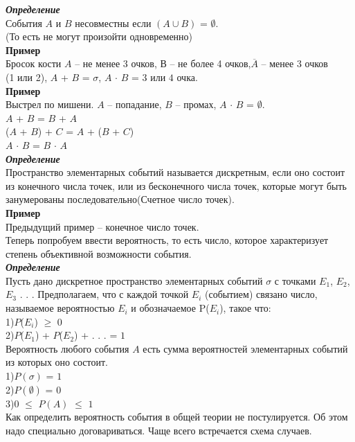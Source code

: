 \documentclass[russian, 12pt, fleqn,x11names]{article}
\begin{document}
\noindent
\textit{\textbf{Определение}} \\События $A$ и $B$ несовместны если $(A \cup B)$ =  $\emptyset$.\\
(То есть не могут произойти одновременно)\\
\textbf{Пример\\}Бросок кости $A$ -- не менее 3 очков, $В$ -- не более 4 очков,$\overline{A}$ -- менее 3 очков\\(1 или 2), $A$ + $B$ = {$\sigma$}, $A$ $\cdot$ $B$ = $3$ или $4$ очка.\\
\textbf{Пример}\\Выстрел по мишени. $A$ -- попадание, $B$ -- промах,  $A$ $\cdot$ $B$ = $\emptyset$.\\
$A$ + $B$ = $B$ + $A$\\
($A$ + $B$) + $C$ = $A$ + ($B$ + $C$)\\
$A$ $\cdot$ $B$ = $B$  $\cdot$ $A$\\
\textit{\textbf{Определение}}\\Пространство элементарных событий называется дискретным, если оно состоит из конечного числа точек, или из бесконечного числа точек, которые могут быть занумерованы последовательно(Счетное число точек).\\
\textbf{Пример}\\Предыдущий пример -- конечное число точек.\\
Теперь попробуем ввести вероятность, то есть число, которое характеризует степень объективной возможности события.\\
\textit{\textbf{Определение}}\\Пусть дано дискретное пространство элементарных событий {$\sigma$} с точками $E_{1}$, $E_{2}$, $E_{3}$ . . .  Предполагаем, что с каждой точкой $E_{i}$ (событием) связано число, называемое вероятностью $E_{i}$ и обозначаемое P($E_{i}$), такое что:\\ 
1)$P$($E_{i}$) $\geq$ $0$  \\
2)$P$($E_{1}$) + $P$($E_{2}$) + . . . = $1$\\
Вероятность любого события $A$ есть сумма вероятностей элементарных событий из которых оно состоит.\\
1)$P(\sigma)$ = $1$\\
2)$P(\emptyset)$ = $0$\\
3)0 $\leq$ $P(A)$ $\leq$ $1$\\
Как определить вероятность события в общей теории не постулируется. Об этом надо специально договариваться. Чаще всего встречается схема случаев.\\
\end{document}
